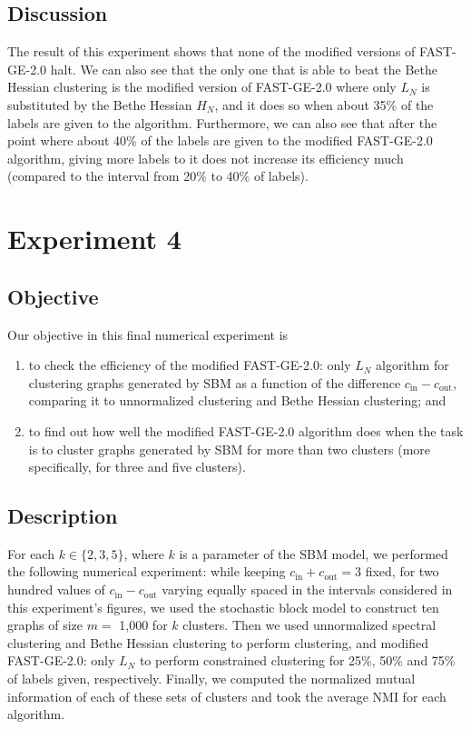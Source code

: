 \subsection*{Discussion}
The result of this experiment shows that none of the modified versions of FAST-GE-2.0 halt.
We can also see that the only one that is able to beat the Bethe Hessian clustering is the modified version of FAST-GE-2.0 where only $L_N$ is substituted by the Bethe Hessian $H_N$, and it does so when about 35\% of the labels are given to the algorithm.
Furthermore, we can also see that after the point where about 40\% of the labels are given to the modified FAST-GE-2.0 algorithm, giving more labels to it does not increase its efficiency much (compared to the interval from 20\% to 40\% of labels).


\section{Experiment 4}
\subsection*{Objective}
Our objective in this final numerical experiment is
\begin{enumerate}[(1)]
   \item to check the efficiency of the modified FAST-GE-2.0: only $L_N$ algorithm for clustering graphs generated by SBM as a function of the difference $c_\text{in} - c_\text{out}$, comparing it to unnormalized clustering and Bethe Hessian clustering; and
   \item to find out how well the modified FAST-GE-2.0 algorithm does when the task is to cluster graphs generated by SBM for more than two clusters (more specifically, for three and five clusters).
\end{enumerate}

\subsection*{Description}
For each $k \in \{ 2, 3, 5 \}$, where $k$ is a parameter of the SBM model, we performed the following numerical experiment: while keeping $c_\text{in} + c_\text{out} = 3$ fixed, for two hundred values of $c_\text{in} - c_\text{out}$ varying equally spaced in the intervals considered in this experiment's figures, we used the stochastic block model to construct ten graphs of size $m =$ 1,000 for $k$ clusters. Then we used unnormalized spectral clustering and Bethe Hessian clustering to perform clustering, and modified FAST-GE-2.0: only $L_N$ to perform constrained clustering for 25\%, 50\% and 75\% of labels given, respectively.
Finally, we computed the normalized mutual information of each of these sets of clusters and took the average NMI for each algorithm.


